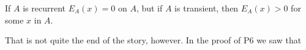 If $A$ is recurrent $E_A(x) = 0$ on $A$, but if $A$ is transient, then $E_A(x) > 0$ for some $x$ in $A$.

That is not quite the end of the story, however. In the proof of P6 we saw that